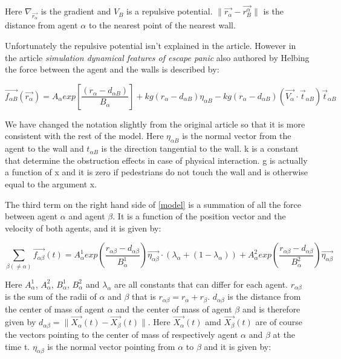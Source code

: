 Here $\nabla_{\vec{r_{\alpha}}}$ is the gradient and $V_B$ is a repulsive 
potential. $ \| \vec{r_{\alpha}} - \vec{r_{B}^{\alpha}} \|$ is the distance 
from agent $\alpha$ to the nearest point of the nearest wall.

Unfortunately the repulsive potential isn't explained in the article. However
in the article \emph{simulation dynamical features of escape panic} also authored
by Helbing the force between the agent and the walls is described by:

\begin{equation}
	\vec{f_{\alpha B}} \left( \vec{r_{\alpha}} \right) =
	A_{\alpha} exp \left[ \frac{\left( r_{\alpha} - d_{\alpha B}   \right)}{B_{\alpha}} \right] + 
	kg \left( r_{\alpha} - d_{\alpha B} \right) \eta_{\alpha B} -
	kg \left( r_{\alpha} - d_{\alpha B} \right) \left( \vec{V_{\alpha}} \cdot \vec{t}_{\alpha B} \right)
	\vec{t}_{\alpha B}
\end{equation} 

We have changed the notation slightly from the original article so that it is more
consistent with the rest of the model. Here $\eta_{\alpha B}$ is the normal vector
from the agent to the wall and $t_{\alpha B}$ is the direction tangential to the wall.
k is a constant that determine the obstruction effects in case of physical interaction.
g is actually a function of x and it is zero if pedestrians do not touch the wall
and is otherwise equal to the argument x.

The third term on the right hand side of \eqref{model} is a summation of all the 
force between agent $\alpha$ and agent $\beta$. It is a function of the position vector and the velocity of 
both agents, and it is given by:

\begin{equation}
    \sum_{\beta \left( \neq \alpha \right)}
        \vec{f_{\alpha \beta }}\left( t \right) =
        A_{\alpha}^{1} exp \left(
            \frac{ r_{\alpha \beta} - d_{\alpha \beta }}
                 {B_{\alpha}^1}
        \right)
    \vec{\eta_{\alpha \beta}} \cdot
    \left(
        \lambda_{\alpha} + \left(
            1 - \lambda_{\alpha}
        \right)
    \right) +
    A_{\alpha}^{2} exp\left(
        \frac{r_{\alpha \beta} - d_{\alpha \beta}}
             {B_{\alpha}^{2}}
    \right)
    \vec{\eta_{\alpha \beta}}
    \label{agentinteraction}
\end{equation}

Here $A_{\alpha}^{1}$, $A_{\alpha}^{2}$, $B_{\alpha}^{1}$, $B_{\alpha}^{2}$ 
and $\lambda_{\alpha}$ are all constants that can differ for each agent. 
$r_{\alpha \beta}$ is the sum of the radii of $\alpha$ and $\beta$ that is 
$r_{\alpha \beta} = r_{\alpha} + r_{\beta}$. $d_{\alpha \beta}$ is the 
distance from the center of mass of agent $\alpha$ and the center of mass of 
agent $\beta$ and is therefore given by $d_{\alpha \beta} = 
\|\vec{X_{\alpha}}\left( t \right) - \vec{X_{\beta}}\left( t \right) \|$. Here 
$\vec{X_{\alpha}}\left( t \right)$ amd $\vec{X_{\beta}}\left( t \right)$ are 
of course the vectors pointing to the center of mass of respectively agent 
$\alpha$ and $\beta$ at the time t. $\eta_{\alpha \beta}$ is the normal vector 
pointing from $\alpha$ to $\beta$ and it is given by:

